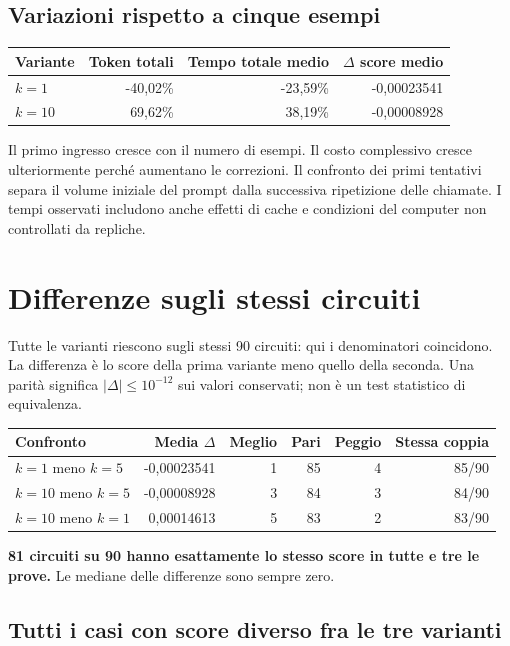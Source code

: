 \documentclass[a4paper,10pt]{article}
\begin{document}
\subsection{Variazioni rispetto a cinque esempi}
\begingroup\small\renewcommand{\arraystretch}{1.18}\setlength{\tabcolsep}{5pt}
\begin{tabularx}{\linewidth}{Xrrr}\toprule
Variante & Token totali & Tempo totale medio & $\Delta$ score medio\\\midrule
$k=1$ & -40,02\% & -23,59\% & -0,00023541\\
$k=10$ & 69,62\% & 38,19\% & -0,00008928\\
\bottomrule\end{tabularx}\endgroup\par
Il primo ingresso cresce con il numero di esempi. Il costo complessivo
cresce ulteriormente perché aumentano le correzioni. Il confronto dei primi
tentativi separa il volume iniziale del prompt dalla successiva ripetizione
delle chiamate. I tempi osservati includono anche effetti di cache e condizioni
del computer non controllati da repliche.
\clearpage\section{Differenze sugli stessi circuiti}
Tutte le varianti riescono sugli stessi 90 circuiti: qui i denominatori
coincidono. La differenza è lo score della prima variante meno quello della
seconda. Una parità significa $|\Delta|\leq10^{-12}$ sui valori conservati;
non è un test statistico di equivalenza.\par\begingroup\small\renewcommand{\arraystretch}{1.18}\setlength{\tabcolsep}{5pt}
\begin{tabularx}{\linewidth}{Xrrrrr}\toprule
Confronto & Media $\Delta$ & Meglio & Pari & Peggio & Stessa coppia\\\midrule
$k=1$ meno $k=5$ & -0,00023541 & 1 & 85 & 4 & 85/90\\
$k=10$ meno $k=5$ & -0,00008928 & 3 & 84 & 3 & 84/90\\
$k=10$ meno $k=1$ & 0,00014613 & 5 & 83 & 2 & 83/90\\
\bottomrule\end{tabularx}\endgroup\par
\textbf{81 circuiti su 90 hanno esattamente lo stesso score in tutte e tre le prove.} Le mediane delle differenze sono sempre zero.\par\subsection{Tutti i casi con score diverso fra le tre varianti}
\end{document}

